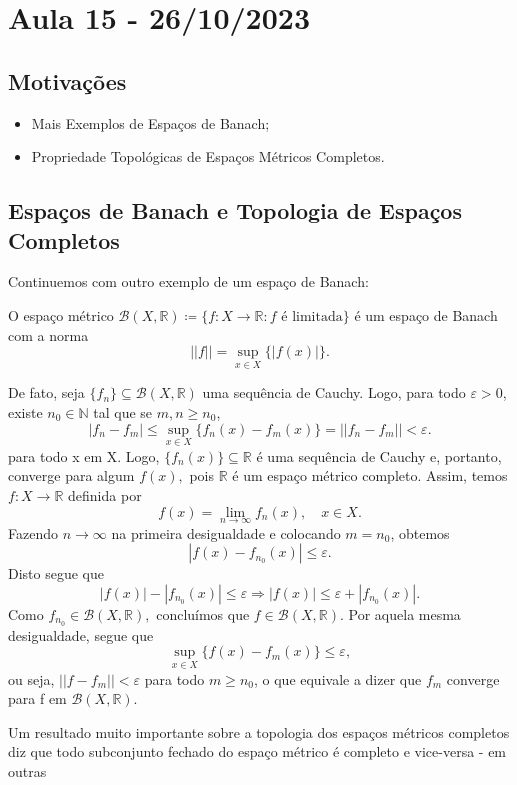 \documentclass[metric_notes.tex]{subfiles}
\begin{document}
\section{Aula 15 - 26/10/2023}
\subsection{Motivações}
\begin{itemize}
	\item Mais Exemplos de Espaços de Banach;
	\item Propriedade Topológicas de Espaços Métricos Completos.
\end{itemize}
\subsection{Espaços de Banach e Topologia de Espaços Completos}
Continuemos com outro exemplo de um espaço de Banach:
\begin{example}
	O espaço métrico \(\mathcal{B}(X, \mathbb{R})\coloneqq \{f:X\rightarrow \mathbb{R}: f\text{ é limitada}\}\) é um espaço de Banach com a norma
	\[
		||f||=\sup_{x\in X}\{|f(x)|\}.
	\]

	De fato, seja \(\{f_{n}\}\subseteq{\mathcal{B}(X, \mathbb{R})}\) uma sequência de Cauchy. Logo, para todo \(\varepsilon >0\), existe \(n_{0}\in \mathbb{N}\) tal que
	se \(m, n\geq n_{0}\),
	\[
		|f_{n}-f_{m}|\leq \sup_{x\in X}\{f_{n}(x)-f_{m}(x)\} = ||f_{n}-f_{m}|| < \varepsilon .
	\]
	para todo x em X. Logo, \(\{f_{n}(x)\}\subseteq{\mathbb{R}}\) é uma sequência de Cauchy e, portanto, converge para algum \(f(x),\) pois \(\mathbb{R}\) é um espaço métrico completo.
	Assim, temos \(f:X\rightarrow \mathbb{R}\) definida por
	\[
		f(x) = \lim_{n\to \infty}f_{n}(x),\quad x\in X.
	\]
	Fazendo \(n\longrightarrow \infty\) na primeira desigualdade e colocando \(m=n_{0}\), obtemos
	\[
		|f(x)-f_{n_{0}}(x)|\leq \varepsilon .
	\]
	Disto segue que
	\[
		|f(x)| - |f_{n_{0}}(x)|\leq \varepsilon \Rightarrow |f(x)|\leq \varepsilon + |f_{n_{0}}(x)|.
	\]
	Como \(f_{n_{0}}\in \mathcal{B}(X, \mathbb{R}),\) concluímos que \(f\in \mathcal{B}(X, \mathbb{R}).\) Por aquela mesma desigualdade, segue que
	\[
		\sup_{x\in X}\{f(x)-f_{m}(x)\}\leq \varepsilon ,
	\]
	ou seja, \(||f-f_{m}|| < \varepsilon \) para todo \(m\geq n_{0}\), o que equivale a dizer que \(f_{m}\) converge para f em \(\mathcal{B}(X, \mathbb{R}).\)
\end{example}
Um resultado muito importante sobre a topologia dos espaços métricos completos diz que todo subconjunto fechado do espaço métrico é completo e vice-versa - em outras
\end{document}
